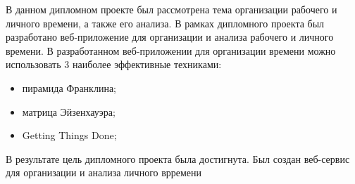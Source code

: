 
В данном дипломном проекте был рассмотрена тема организации рабочего и личного времени, а также его анализа. 
В рамках дипломного проекта был разработано веб-приложение для организации и анализа рабочего и личного времени. 
В разработанном веб-приложении для организации времени можно использовать 3 наиболее эффективные техниками:

\begin{itemize}
	\item пирамида Франклина;
	\item матрица Эйзенхауэра;
	\item Getting Things Done;
\end{itemize}

В результате цель дипломного проекта была достигнута. 
Был создан веб-сервис для организации и анализа личного врремени 